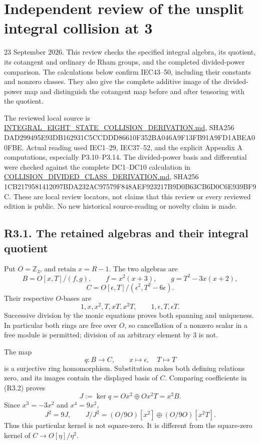 \documentclass[
  10pt,
]{article}
\author{}
\date{}
\begin{document}
\section{Independent review of the unsplit integral collision at
3}\label{independent-review-of-the-unsplit-integral-collision-at-3}

23 September 2026. This review checks the specified integral algebra,
its quotient, its cotangent and ordinary de Rham groups, and the
completed divided-power comparison. The calculations below confirm
IEC43--50, including their constants and nonzero classes. They also give
the complete additive image of the divided-power map and distinguish the
cotangent map before and after tensoring with the quotient.

The reviewed local source is
\url{INTEGRAL_EIGHT_STATE_COLLISION_DERIVATION.md}, SHA256
DAD299495E93DB162931C5CCDDD86610F352BA046A9F13FB91A9FD1ABEA00FBE. Actual
reading used IEC1--29, IEC37--52, and the explicit Appendix A
computations, especially P3.10--P3.14. The divided-power basis and
differential were checked against the complete DC1--DC10 calculation in
\url{COLLISION_DIVIDED_CLASS_DERIVATION.md}, SHA256
1CB2179581412097BDA232AC97579F848AEF923217B9D0B63CB6D0C6E939BF9C. These
are local review locators, not claims that this review or every reviewed
edition is public. No new historical source-reading or novelty claim is
made.

\subsection{R3.1. The retained algebras and their integral
quotient}\label{r3.1.-the-retained-algebras-and-their-integral-quotient}

Put \(O=\mathbb Z_3\), and retain \(x=R-1\). The two algebras are \[
B=O[x,T]/(f,g),\qquad
f=x^2(x+3),\qquad g=T^2-3x(x+2),
\] \[
C=O[\epsilon,T]/(\epsilon^2,T^2-6\epsilon).
\tag{R3.1}
\] Their respective \(O\)-bases are \[
1,x,x^2,T,xT,x^2T,\qquad
1,\epsilon,T,\epsilon T.
\tag{R3.2}
\] Successive division by the monic equations proves both spanning and
uniqueness. In particular both rings are free over \(O\), so
cancellation of a nonzero scalar in a free module is permitted; division
of an arbitrary element by 3 is not.

The map \[
q:B\longrightarrow C,\qquad x\longmapsto\epsilon,\quad T\longmapsto T
\tag{R3.3}
\] is a surjective ring homomorphism. Substitution makes both defining
relations zero, and its images contain the displayed basis of \(C\).
Comparing coefficients in (R3.2) proves \[
J:=\ker q=Ox^2\oplus Ox^2T=x^2B.
\] Since \(x^3=-3x^2\) and \(x^4=9x^2\), \[
J^2=9J,\qquad
J/J^2=(O/9O)[x^2]\oplus(O/9O)[x^2T].
\tag{R3.4}
\] Thus this particular kernel is not square-zero. It is different from
the square-zero kernel of \(C\to O[\eta]/\eta^2\).
\end{document}
